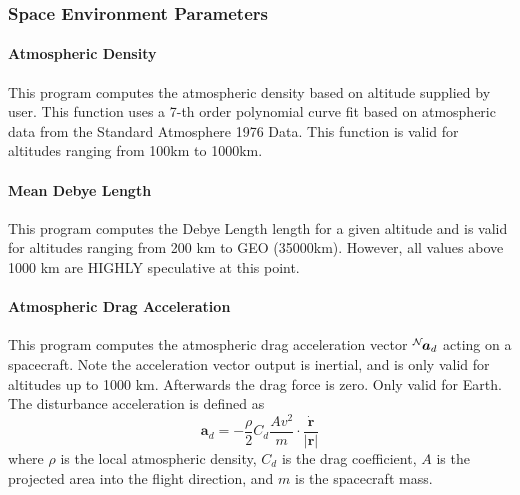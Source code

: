 \subsubsection{Space Environment Parameters}
\paragraph{Atmospheric Density}
This program computes the atmospheric density based on altitude  supplied by user.  This function uses a 7-th order polynomial curve fit based on  atmospheric data from the Standard Atmosphere 1976 Data. This function is valid for altitudes ranging from 100km to 1000km.

\paragraph{Mean Debye Length}
This program computes the Debye Length length for a given  altitude and is valid for altitudes ranging  from 200 km to GEO (35000km).  However, all values above   1000 km are HIGHLY speculative at this point.

\paragraph{Atmospheric Drag Acceleration}
This program computes the atmospheric drag acceleration   vector $\leftexp{N}{\bm a}_{d}$ acting on a spacecraft.   Note the acceleration vector output is inertial, and is   only valid for altitudes up to 1000 km.   Afterwards the drag force is zero. Only valid for Earth.  The disturbance acceleration is defined as
\begin{equation}
	\bm a_{d} = -\frac{\rho}{2} C_{d} \frac{A v^{2}}{m} \cdot \frac{\dot{\bm r}}{|\bm r|}
\end{equation}
where $\rho$ is the local atmospheric density, $C_{d}$ is the drag coefficient, $A$ is the projected area into the flight direction, and $m$ is the spacecraft mass.


